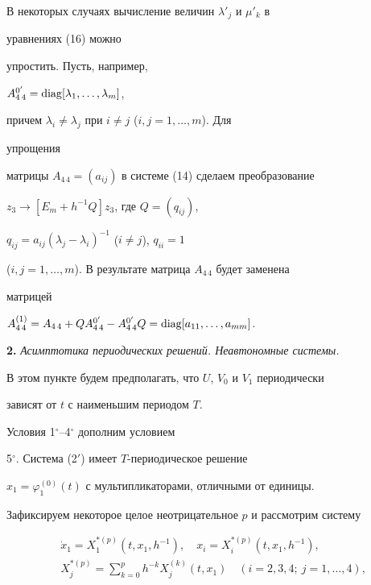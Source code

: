  


\begin{notenonum} 


В некоторых случаях вычисление величин $\lambda'_j$ и $\mu'_k$ в 


уравнениях (16) можно 


упростить. Пусть, например, 


$A^{0'}_{4\,4}=\operatorname{diag}[\lambda_1,\dotsc,\lambda_m]$, 


причем $\lambda_i\ne\lambda_j$ при $i\ne j$ ($i,j=1,\dotsc,m$). Для 


упрощения 


матрицы $A_{4\,4}=(a_{ij})$ в системе (14) сделаем преобразование 


$z_3\to[E_m+h^{-1}Q]z_3$, где $Q=(q_{ij})$, 


$q_{ij}=a_{ij}(\lambda_j-\lambda_i)^{-1}$ ($i\ne j$), $q_{ii}=1$ 


($i,j=1,\dotsc,m$). В результате матрица $A_{4\,4}$ будет заменена 


матрицей 


$A^{(1)}_{4\,4}=A_{4\,4}+Q A^{0'}_{4\,4}-A^{0'}_{4\,4}Q= 


\diag[a_{11},\dotsc,a_{mm}]$. 


\end{notenonum} 


 


{\bf 2.} {\it Асимптотика периодических решений. Неавтономные системы.} 


В этом пункте будем предполагать, что $U$, $V_0$ и $V_1$ периодически 


зависят от $t$ с наименьшим периодом $T$. 


 


Условия 1${}^\circ$--4${}^\circ$ дополним условием 


\medskip 





5${}^\circ$. Система (2${}'$) имеет $T$-периодическое решение 


$x_1=\varphi^{(0)}_1(t)$ с мультипликаторами, отличными от единицы. 


\medskip 


 


Зафиксируем некоторое целое неотрицательное $p$ и рассмотрим систему 


\begin{equation} 


\begin{split} 


& \Dot x_1=X^{*(p)}_1(t,x_1,h^{-1}),\quad 


x_i=X^{*(p)}_i(t,x_1,h^{-1}), \\ 


& X^{*(p)}_j=\sum^p_{k=0}h^{-k}X^{(k)}_j(t,x_1) \quad 


(i=2,3,4; \ j=1,\dotsc,4), 


\end{split} 


\end{equation} 


